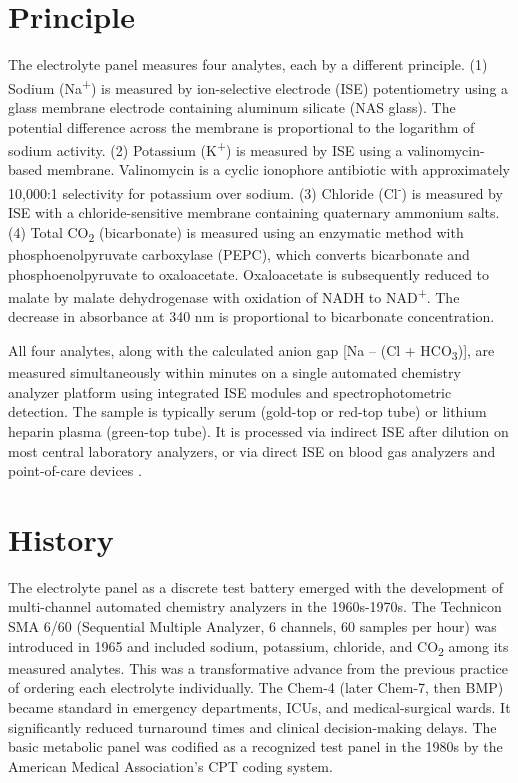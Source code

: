 \section*{Principle}
The electrolyte panel measures four analytes, each by a different principle. (1) Sodium (Na\textsuperscript{+}) is measured by ion-selective electrode (ISE) potentiometry using a glass membrane electrode containing aluminum silicate (NAS glass). The potential difference across the membrane is proportional to the logarithm of sodium activity. (2) Potassium (K\textsuperscript{+}) is measured by ISE using a valinomycin-based membrane. Valinomycin is a cyclic ionophore antibiotic with approximately 10,000:1 selectivity for potassium over sodium. (3) Chloride (Cl\textsuperscript{-}) is measured by ISE with a chloride-sensitive membrane containing quaternary ammonium salts. (4) Total CO\textsubscript{2} (bicarbonate) is measured using an enzymatic method with phosphoenolpyruvate carboxylase (PEPC), which converts bicarbonate and phosphoenolpyruvate to oxaloacetate. Oxaloacetate is subsequently reduced to malate by malate dehydrogenase with oxidation of NADH to NAD\textsuperscript{+}. The decrease in absorbance at 340 nm is proportional to bicarbonate concentration.

All four analytes, along with the calculated anion gap [Na -- (Cl + HCO\textsubscript{3})], are measured simultaneously within minutes on a single automated chemistry analyzer platform using integrated ISE modules and spectrophotometric detection. The sample is typically serum (gold-top or red-top tube) or lithium heparin plasma (green-top tube). It is processed via indirect ISE after dilution on most central laboratory analyzers, or via direct ISE on blood gas analyzers and point-of-care devices \cite{tietz2023textbook}.

\section*{History}
The electrolyte panel as a discrete test battery emerged with the development of multi-channel automated chemistry analyzers in the 1960s-1970s. The Technicon SMA 6/60 (Sequential Multiple Analyzer, 6 channels, 60 samples per hour) was introduced in 1965 and included sodium, potassium, chloride, and CO\textsubscript{2} among its measured analytes. This was a transformative advance from the previous practice of ordering each electrolyte individually. The Chem-4 (later Chem-7, then BMP) became standard in emergency departments, ICUs, and medical-surgical wards. It significantly reduced turnaround times and clinical decision-making delays. The basic metabolic panel was codified as a recognized test panel in the 1980s by the American Medical Association's CPT coding system.

